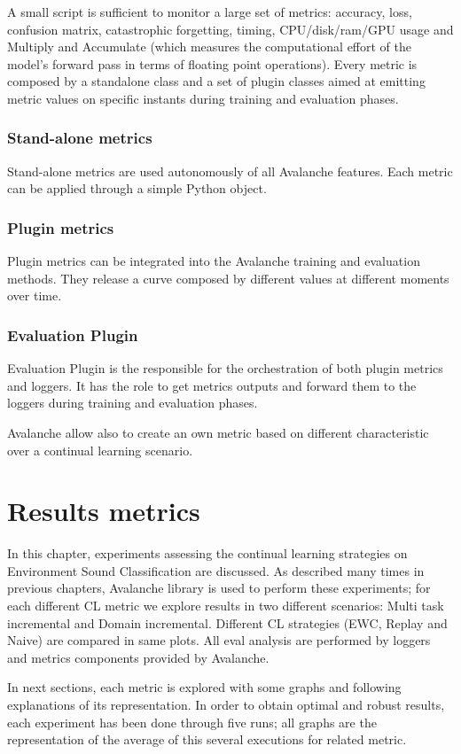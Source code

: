 \documentclass[english, LaM, oneside]{sapthesis}%
\begin{document}
A small script is sufficient to monitor a large set of metrics: accuracy, loss, confusion matrix, catastrophic forgetting,  timing, CPU/disk/ram/GPU usage and Multiply and Accumulate (which measures the computational effort of the model’s forward pass in terms of floating point operations). Every metric is composed by a standalone class and a set of plugin classes aimed at emitting metric values on specific instants during training and evaluation phases.

\subsection{Stand-alone metrics}
Stand-alone metrics are used autonomously of all Avalanche features. Each metric can be applied through a simple Python object.
\subsection{Plugin metrics}
Plugin metrics can be integrated into the Avalanche training and evaluation methods. They release a curve composed by different values at different moments over time.
\subsection{Evaluation Plugin}
Evaluation Plugin is the responsible for the orchestration of both plugin metrics and loggers. It has the role to get metrics outputs and forward them to the loggers during training and evaluation phases.

Avalanche allow also to create an own metric based on different characteristic over a continual learning scenario.



\chapter{Results metrics}
\label{results}
In this chapter, experiments assessing the continual learning strategies on Environment Sound Classification are discussed. As described many times in previous chapters, Avalanche library is used to perform these experiments; for each different CL metric we explore results in two different scenarios: Multi task incremental and Domain incremental. Different CL strategies (EWC, Replay and Naive) are compared in same plots. All eval analysis are performed by loggers and metrics components provided by Avalanche.

In next sections, each metric is explored with some graphs and following explanations of its representation. In order to obtain optimal and robust results, each experiment has been done through five runs; all graphs are the representation of the average of this several executions for related metric.
\end{document}
